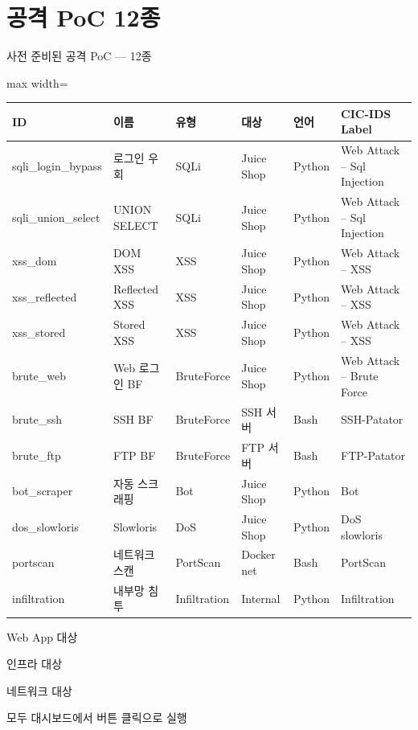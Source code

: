 \documentclass[aspectratio=169,10pt]{beamer}
\begin{document}
\section{공격 PoC 12종}

\begin{frame}{사전 준비된 공격 PoC — 12종}
\begin{adjustbox}{max width=\textwidth}
\footnotesize
\begin{tabular}{llllll}
\toprule
\textbf{ID} & \textbf{이름} & \textbf{유형} & \textbf{대상} & \textbf{언어} & \textbf{CIC-IDS Label} \\
\midrule
\rowcolor{layer3} sqli\_login\_bypass & 로그인 우회 & SQLi & Juice Shop & Python & Web Attack -- Sql Injection \\
\rowcolor{layer3} sqli\_union\_select & UNION SELECT & SQLi & Juice Shop & Python & Web Attack -- Sql Injection \\
\rowcolor{layer3} xss\_dom & DOM XSS & XSS & Juice Shop & Python & Web Attack -- XSS \\
\rowcolor{layer3} xss\_reflected & Reflected XSS & XSS & Juice Shop & Python & Web Attack -- XSS \\
\rowcolor{layer3} xss\_stored & Stored XSS & XSS & Juice Shop & Python & Web Attack -- XSS \\
\rowcolor{layer3} brute\_web & Web 로그인 BF & BruteForce & Juice Shop & Python & Web Attack -- Brute Force \\
\rowcolor{layer1} brute\_ssh & SSH BF & BruteForce & SSH 서버 & Bash & SSH-Patator \\
\rowcolor{layer1} brute\_ftp & FTP BF & BruteForce & FTP 서버 & Bash & FTP-Patator \\
\rowcolor{layer2} bot\_scraper & 자동 스크래핑 & Bot & Juice Shop & Python & Bot \\
\rowcolor{layer2} dos\_slowloris & Slowloris & DoS & Juice Shop & Python & DoS slowloris \\
\rowcolor{layer2} portscan & 네트워크 스캔 & PortScan & Docker net & Bash & PortScan \\
\rowcolor{layer3} infiltration & 내부망 침투 & Infiltration & Internal & Python & Infiltration \\
\bottomrule
\end{tabular}
\end{adjustbox}
\vspace{0.3em}

{\footnotesize \colorbox{layer3}{\strut Web App 대상} \quad \colorbox{layer1}{\strut 인프라 대상} \quad \colorbox{layer2}{\strut 네트워크 대상} \quad 모두 대시보드에서 버튼 클릭으로 실행}
\end{frame}
\end{document}
